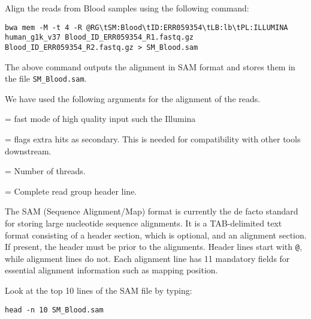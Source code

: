 \begin{steps}
Align the reads from Blood samples using the following command: 

\begin{lstlisting}
bwa mem -M -t 4 -R @RG\tSM:Blood\tID:ERR059354\tLB:lb\tPL:ILLUMINA human_g1k_v37 Blood_ID_ERR059354_R1.fastq.gz Blood_ID_ERR059354_R2.fastq.gz > SM_Blood.sam
\end{lstlisting}

The above command outputs the alignment in SAM format and stores them in the
file \texttt{SM\_Blood.sam}.
\end{steps}

\begin{note}
We have used the following arguments for the alignment of the reads.
\begin{description}[style=multiline,labelindent=0cm,align=right,leftmargin=\descriptionlabelspace,rightmargin=1.5cm,font=\ttfamily]
  \item[mem] = fast mode of high quality input such the Illumina
  \item[-M] = flags extra hits as secondary. This is needed for compatibility with other tools downstream.
  \item[-t] = Number of threads.
  \item[-R] = Complete read group header line.
\end{description}

\end{note}

\begin{information}
The SAM (Sequence Alignment/Map) format is currently the de facto standard for storing large nucleotide sequence alignments. It is a TAB-delimited text format consisting of a header section, which is optional, and an alignment section. If present, the header must be prior to the alignments. Header lines start with \texttt{@}, while alignment lines do not. Each alignment line has 11 mandatory fields for essential alignment information such as mapping position.
\end{information}


\begin{steps}
Look at the top 10 lines of the SAM file by typing:

\begin{lstlisting}
head -n 10 SM_Blood.sam
\end{lstlisting}
\end{steps}

